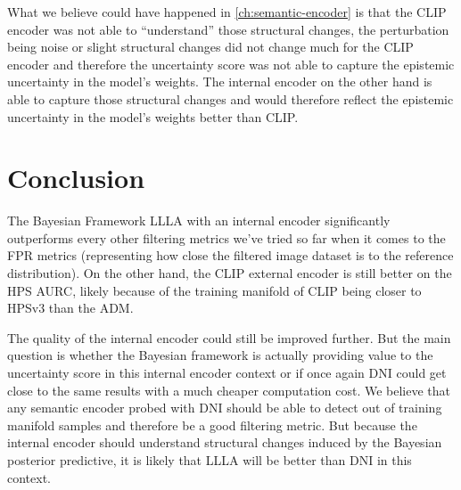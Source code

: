 What we believe could have happened in \autoref{ch:semantic-encoder} is that the \acs{CLIP} encoder was not able to ``understand'' those structural changes, the perturbation being noise or slight structural changes did not change much for the \acs{CLIP} encoder and therefore the uncertainty score was not able to capture the epistemic uncertainty in the model's weights. The internal encoder on the other hand is able to capture those structural changes and would therefore reflect the epistemic uncertainty in the model's weights better than \acs{CLIP}.

\section{Conclusion}

The Bayesian Framework \acs{LLLA} with an internal encoder significantly outperforms every other filtering metrics we've tried so far when it comes to the \acs{FPR} metrics (representing how close the filtered image dataset is to the reference distribution). On the other hand, the \acs{CLIP} external encoder is still better on the \acs{HPS} \acs{AURC}, likely because of the training manifold of \acs{CLIP} being closer to HPSv3 than the \acs{ADM}.

The quality of the internal encoder could still be improved further. But the main question is whether the Bayesian framework is actually providing value to the uncertainty score in this internal encoder context or if once again \acs{DNI} could get close to the same results with a much cheaper computation cost. We believe that any semantic encoder probed with \acs{DNI} should be able to detect out of training manifold samples and therefore be a good filtering metric. 
But because the internal encoder should understand structural changes induced by the Bayesian posterior predictive, it is likely that \acs{LLLA} will be better than \acs{DNI} in this context. 



